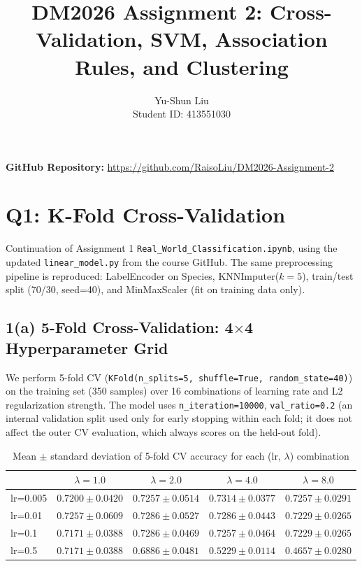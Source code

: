 \documentclass[11pt]{article}
\title{DM2026 Assignment 2: Cross-Validation, SVM, Association Rules, and Clustering}
\author{Yu-Shun Liu \\ Student ID: 413551030}
\date{}
\begin{document}
\maketitle

\noindent\textbf{GitHub Repository:} \url{https://github.com/RaisoLiu/DM2026-Assignment-2}

\section{Q1: K-Fold Cross-Validation}

Continuation of Assignment 1 \texttt{Real\_World\_Classification.ipynb}, using the updated \texttt{linear\_model.py} from the course GitHub. The same preprocessing pipeline is reproduced: LabelEncoder on Species, KNNImputer($k=5$), train/test split (70/30, seed=40), and MinMaxScaler (fit on training data only).

\subsection{1(a) 5-Fold Cross-Validation: 4$\times$4 Hyperparameter Grid}

We perform 5-fold CV (\texttt{KFold(n\_splits=5, shuffle=True, random\_state=40)}) on the training set (350 samples) over 16 combinations of learning rate and L2 regularization strength. The model uses \texttt{n\_iteration=10000}, \texttt{val\_ratio=0.2} (an internal validation split used only for early stopping within each fold; it does not affect the outer CV evaluation, which always scores on the held-out fold).

\begin{table}[H]
\centering
\caption{Mean $\pm$ standard deviation of 5-fold CV accuracy for each (lr, $\lambda$) combination\label{tab:cv-grid}}
\begin{tabular}{lcccc}
\toprule
 & $\lambda=1.0$ & $\lambda=2.0$ & $\lambda=4.0$ & $\lambda=8.0$ \\
\midrule
lr=0.005 & $0.7200 \pm 0.0420$ & $0.7257 \pm 0.0514$ & $\mathbf{0.7314 \pm 0.0377}$ & $0.7257 \pm 0.0291$ \\
lr=0.01  & $0.7257 \pm 0.0609$ & $0.7286 \pm 0.0527$ & $0.7286 \pm 0.0443$ & $0.7229 \pm 0.0265$ \\
lr=0.1   & $0.7171 \pm 0.0388$ & $0.7286 \pm 0.0469$ & $0.7257 \pm 0.0464$ & $0.7229 \pm 0.0265$ \\
lr=0.5   & $0.7171 \pm 0.0388$ & $0.6886 \pm 0.0481$ & $0.5229 \pm 0.0114$ & $0.4657 \pm 0.0280$ \\
\bottomrule
\end{tabular}
\end{table}
\end{document}
